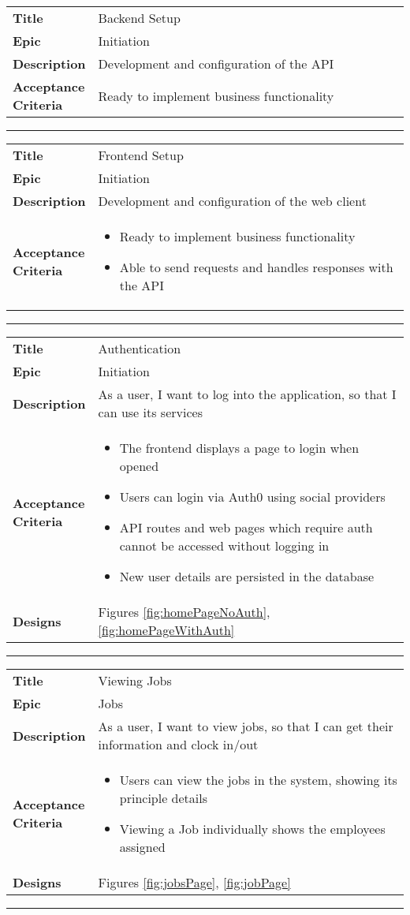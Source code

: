 \newcommand{\designs}[1]{\textbf{Designs} & Figures #1}

\newcommand{\story}[5]
{
  \begin{tabular}{p{0.2\linewidth}p{0.8\linewidth}}
    \textbf{Title}               & #1 \\
    \textbf{Epic}                & #2 \\
    \textbf{Description}         & #3 \\
    \textbf{Acceptance Criteria} & #4 \\
    #5
  \end{tabular}
}

\story{Backend Setup}{Initiation}
{
  Development and configuration of the API
}
{
  Ready to implement business functionality
}{} \hrule

\story{Frontend Setup}{Initiation}
{
Development and configuration of the web client
}
{
\begin{itemize}[leftmargin=*]
  \item Ready to implement business functionality
  \item Able to send requests and handles responses with
        the API
\end{itemize}
}{} \hrule

\story{Authentication}{Initiation}
{
As a user, I want to log into the application, so that
I can use its services
}
{
\begin{itemize}[leftmargin=*]
  \item The frontend displays a page to login when opened
  \item Users can login via Auth0 using social providers
  \item API routes and web pages which require auth cannot
        be accessed without logging in
  \item New user details are persisted in the database
\end{itemize}
}
{
\designs{\ref{fig:homePageNoAuth},
  \ref{fig:homePageWithAuth}}
} \hrule

\story{Viewing Jobs}{Jobs}
{
  As a user, I want to view jobs, so that I can get their
  information and clock in/out
}
{
  \begin{itemize}[leftmargin=*]
    \item Users can view the jobs in the system, showing
          its principle details
    \item Viewing a Job individually shows the employees
          assigned
  \end{itemize}
}
{
  \designs{\ref{fig:jobsPage}, \ref{fig:jobPage}}
} \hrule

